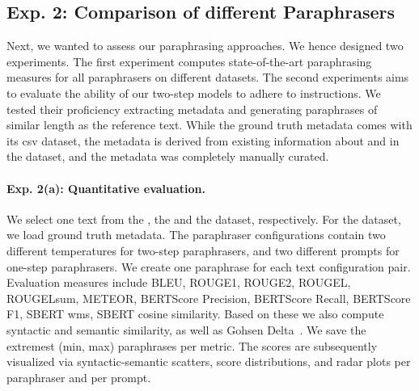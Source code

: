 \subsection{Exp. 2: Comparison of different Paraphrasers}
\label{subsec:comp_paraphrasers_setup}

Next, we wanted to assess our paraphrasing approaches.
We hence designed two experiments.
The first experiment computes state-of-the-art paraphrasing measures for all paraphrasers on different datasets.
The second experiments aims to evaluate the ability of our two-step models to adhere to instructions.
We tested their proficiency extracting metadata and generating paraphrases of similar length as the reference text.
While the \dataBlog{} ground truth metadata comes with its csv dataset, the \dataStudent{} metadata is derived from existing information about and in the dataset, and the \dataGutenberg{} metadata was completely manually curated.

\paragraph{Exp. 2(a): Quantitative evaluation.}

We select one text from the \dataBlog{}, the \dataGutenberg{} and the \dataStudent{} dataset, respectively.
For the \dataGutenberg{} dataset, we load ground truth metadata. %
The paraphraser configurations contain two different temperatures for two-step paraphrasers, and two different prompts for one-step paraphrasers.
We create one paraphrase for each text configuration pair.
Evaluation measures include BLEU, ROUGE1, ROUGE2, ROUGEL, ROUGELsum, METEOR, BERTScore Precision, BERTScore Recall, BERTScore F1, SBERT \ac{wms}, SBERT cosine similarity.
Based on these we also compute syntactic and semantic similarity, as well as Gohsen Delta~\citep{gohsen_captions_2023}.
We save the extremest (min, max) paraphrases per metric.
The scores are subsequently visualized via syntactic-semantic scatters, score distributions, and radar plots per paraphraser and per prompt. 

